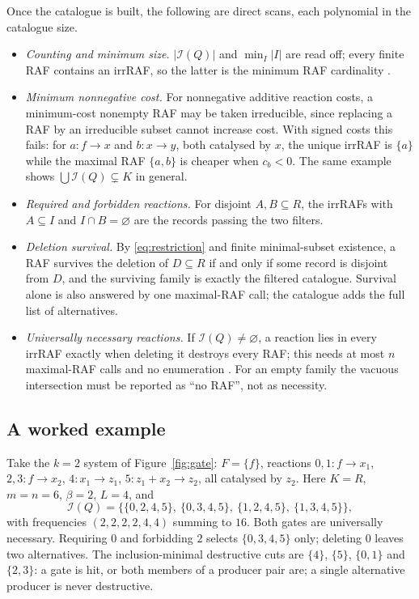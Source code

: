 \documentclass[11pt,a4paper]{article}
\theoremstyle{plain}
\theoremstyle{definition}
\theoremstyle{remark}
\newcommand{\Irr}{\mathcal I}
\begin{document}
Once the catalogue is built, the following are direct scans, each polynomial in the catalogue size.
\begin{itemize}
\item \emph{Counting and minimum size.} $|\Irr(Q)|$ and $\min_I|I|$ are read off; every finite RAF contains an irrRAF, so the latter is the minimum RAF cardinality \cite{steel2013minimal}.
\item \emph{Minimum nonnegative cost.} For nonnegative additive reaction costs, a minimum-cost nonempty RAF may be taken irreducible, since replacing a RAF by an irreducible subset cannot increase cost. With signed costs this fails: for $a\colon f\to x$ and $b\colon x\to y$, both catalysed by $x$, the unique irrRAF is $\{a\}$ while the maximal RAF $\{a,b\}$ is cheaper when $c_b<0$. The same example shows $\bigcup\Irr(Q)\subsetneq K$ in general.
\item \emph{Required and forbidden reactions.} For disjoint $A,B\subseteq R$, the irrRAFs with $A\subseteq I$ and $I\cap B=\varnothing$ are the records passing the two filters.
\item \emph{Deletion survival.} By \eqref{eq:restriction} and finite minimal-subset existence, a RAF survives the deletion of $D\subseteq R$ if and only if some record is disjoint from $D$, and the surviving family is exactly the filtered catalogue. Survival alone is also answered by one maximal-RAF call; the catalogue adds the full list of alternatives.
\item \emph{Universally necessary reactions.} If $\Irr(Q)\ne\varnothing$, a reaction lies in every irrRAF exactly when deleting it destroys every RAF; this needs at most $n$ maximal-RAF calls and no enumeration \cite{classification2026}. For an empty family the vacuous intersection must be reported as ``no RAF'', not as necessity.
\end{itemize}

\subsection{A worked example}\label{sec:worked}

Take the $k=2$ system of Figure~\ref{fig:gate}: $F=\{f\}$, reactions $0,1\colon f\to x_1$, $2,3\colon f\to x_2$, $4\colon x_1\to z_1$, $5\colon z_1+x_2\to z_2$, all catalysed by $z_2$. Here $K=R$, $m=n=6$, $\beta=2$, $L=4$, and
\[
 \Irr(Q)=\bigl\{\{0,2,4,5\},\ \{0,3,4,5\},\ \{1,2,4,5\},\ \{1,3,4,5\}\bigr\},
\]
with frequencies $(2,2,2,2,4,4)$ summing to $16$. Both gates are universally necessary. Requiring $0$ and forbidding $2$ selects $\{0,3,4,5\}$ only; deleting $0$ leaves two alternatives. The inclusion-minimal destructive cuts are $\{4\}$, $\{5\}$, $\{0,1\}$ and $\{2,3\}$: a gate is hit, or both members of a producer pair are; a single alternative producer is never destructive.
\end{document}
